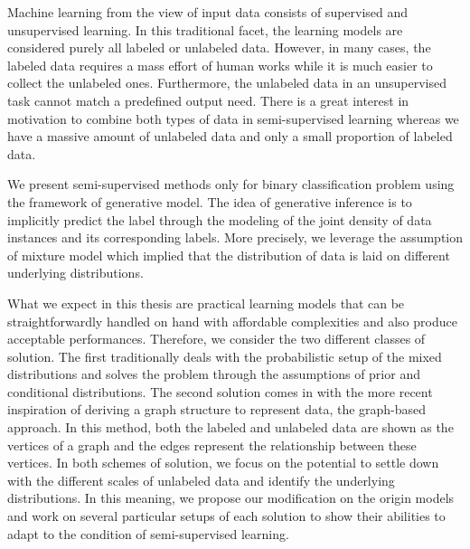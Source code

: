 Machine learning from the view of input data consists of supervised and unsupervised learning. In this traditional facet, the learning models are considered purely all labeled or unlabeled data. However, in many cases, the labeled data requires a mass effort of human works while it is much easier to collect the unlabeled ones. Furthermore, the unlabeled data in an unsupervised task cannot match a predefined output need. There is a great interest in motivation to combine both types of data in semi-supervised learning whereas we have a massive amount of unlabeled data and only a small proportion of labeled data.

We present semi-supervised methods only for binary classification problem using the framework of generative model. The idea of generative inference is to implicitly predict the label through the modeling of the joint density of data instances and its corresponding labels. More precisely, we leverage the assumption of mixture model which implied that the distribution of data is laid on different underlying distributions.

What we expect in this thesis are practical learning models that can be straightforwardly handled on hand with affordable complexities and also produce acceptable performances. Therefore, we consider the two different classes of solution. The first traditionally deals with the probabilistic setup of the mixed distributions and solves the problem through the assumptions of prior and conditional distributions. The second solution comes in with the more recent inspiration of deriving a graph structure to represent data, the graph-based approach. In this method, both the labeled and unlabeled data are shown as the vertices of a graph and the edges represent the relationship between these vertices. In both schemes of solution, we focus on the potential to settle down with the different scales of unlabeled data and identify the underlying distributions. In this meaning, we propose our modification on the origin models and work on several particular setups of each solution to show their abilities to adapt to the condition of semi-supervised learning.